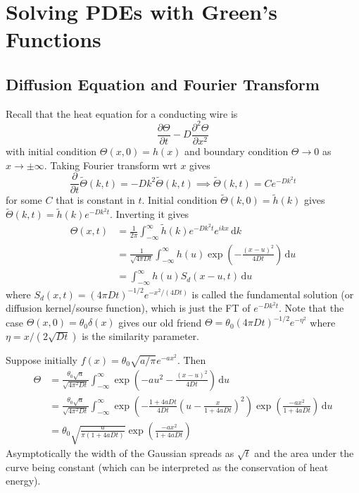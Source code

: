 \section{Solving PDEs with Green's Functions}
\subsection{Diffusion Equation and Fourier Transform}
Recall that the heat equation for a conducting wire is
$$\frac{\partial\Theta}{\partial t}-D\frac{\partial^2\Theta}{\partial x^2}$$
with initial condition $\Theta(x,0)=h(x)$ and boundary condition $\Theta\to 0$ as $x\to\pm\infty$.
Taking Fourier transform wrt $x$ gives
$$\frac{\partial}{\partial t}\tilde{\Theta}(k,t)=-Dk^2\tilde\Theta(k,t)\implies\tilde\Theta(k,t)=Ce^{-Dk^2t}$$
for some $C$ that is constant in $t$.
Initial condition $\tilde{\Theta}(k,0)=\tilde{h}(k)$ gives $\tilde\Theta(k,t)=\tilde{h}(k)e^{-Dk^2t}$.
Inverting it gives
\begin{align*}
    \Theta(x,t)&=\frac{1}{2\pi}\int_{-\infty}^\infty \tilde{h}(k)e^{-Dk^2t}e^{ikx}\,\mathrm dk\\
    &=\frac{1}{\sqrt{4\pi Dt}}\int_{-\infty}^\infty h(u)\exp\left( -\frac{(x-u)^2}{4Dt} \right)\,\mathrm du\\
    &=\int_{-\infty}^\infty h(u)S_d(x-u,t)\,\mathrm du
\end{align*}
where $S_d(x,t)=(4\pi Dt)^{-1/2}e^{-x^2/(4Dt)}$ is called the fundamental solution (or diffusion kernel/sourse function), which is just the FT of $e^{-Dk^2t}$.
Note that the case $\Theta(x,0)=\theta_0\delta(x)$ gives our old friend $\Theta=\theta_0(4\pi Dt)^{-1/2}e^{-\eta^2}$ where $\eta=x/(2\sqrt{Dt})$ is the similarity parameter.
\begin{example}
    Suppose initially $f(x)=\theta_0\sqrt{a/\pi}e^{-ax^2}$.
    Then
    \begin{align*}
        \Theta&=\frac{\theta_0\sqrt{a}}{\sqrt{4\pi^2Dt}}\int_{-\infty}^\infty\exp\left( -au^2-\frac{(x-u)^2}{4Dt} \right)\,\mathrm du\\
        &=\frac{\theta_0\sqrt{a}}{\sqrt{4\pi^2Dt}}\int_{-\infty}^\infty\exp\left( -\frac{1+4aDt}{4Dt}\left( u-\frac{x}{1+4aDt} \right)^2 \right)\exp\left( \frac{-ax^2}{1+4aDt} \right)\,\mathrm du\\
        &=\theta_0\sqrt{\frac{a}{\pi(1+4aDt)}}\exp\left( \frac{-ax^2}{1+4aDt} \right)
    \end{align*}
    Asymptotically the width of the Gaussian spreads as $\sqrt{t}$ and the area under the curve being constant (which can be interpreted as the conservation of heat energy).
\end{example}
